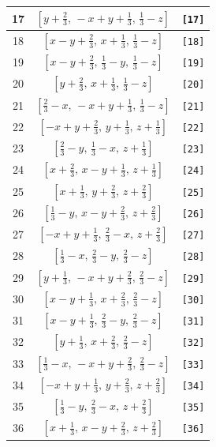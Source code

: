 \documentclass[fleqn,8pt]{jsarticle}
\begin{document}
\begin{longtable}{ccc}
17 & $\left[ y + \frac{2}{3},\, - x + y + \frac{1}{3},\, \frac{1}{3} - z \right]$ & {\tt [17]} \\ \hline
18 & $\left[ x - y + \frac{2}{3},\, x + \frac{1}{3},\, \frac{1}{3} - z \right]$ & {\tt [18]} \\ \hline
19 & $\left[ x - y + \frac{2}{3},\, \frac{1}{3} - y,\, \frac{1}{3} - z \right]$ & {\tt [19]} \\ \hline
20 & $\left[ y + \frac{2}{3},\, x + \frac{1}{3},\, \frac{1}{3} - z \right]$ & {\tt [20]} \\ \hline
21 & $\left[ \frac{2}{3} - x,\, - x + y + \frac{1}{3},\, \frac{1}{3} - z \right]$ & {\tt [21]} \\ \hline
22 & $\left[ - x + y + \frac{2}{3},\, y + \frac{1}{3},\, z + \frac{1}{3} \right]$ & {\tt [22]} \\ \hline
23 & $\left[ \frac{2}{3} - y,\, \frac{1}{3} - x,\, z + \frac{1}{3} \right]$ & {\tt [23]} \\ \hline
24 & $\left[ x + \frac{2}{3},\, x - y + \frac{1}{3},\, z + \frac{1}{3} \right]$ & {\tt [24]} \\ \hline
25 & $\left[ x + \frac{1}{3},\, y + \frac{2}{3},\, z + \frac{2}{3} \right]$ & {\tt [25]} \\ \hline
26 & $\left[ \frac{1}{3} - y,\, x - y + \frac{2}{3},\, z + \frac{2}{3} \right]$ & {\tt [26]} \\ \hline
27 & $\left[ - x + y + \frac{1}{3},\, \frac{2}{3} - x,\, z + \frac{2}{3} \right]$ & {\tt [27]} \\ \hline
28 & $\left[ \frac{1}{3} - x,\, \frac{2}{3} - y,\, \frac{2}{3} - z \right]$ & {\tt [28]} \\ \hline
29 & $\left[ y + \frac{1}{3},\, - x + y + \frac{2}{3},\, \frac{2}{3} - z \right]$ & {\tt [29]} \\ \hline
30 & $\left[ x - y + \frac{1}{3},\, x + \frac{2}{3},\, \frac{2}{3} - z \right]$ & {\tt [30]} \\ \hline
31 & $\left[ x - y + \frac{1}{3},\, \frac{2}{3} - y,\, \frac{2}{3} - z \right]$ & {\tt [31]} \\ \hline
32 & $\left[ y + \frac{1}{3},\, x + \frac{2}{3},\, \frac{2}{3} - z \right]$ & {\tt [32]} \\ \hline
33 & $\left[ \frac{1}{3} - x,\, - x + y + \frac{2}{3},\, \frac{2}{3} - z \right]$ & {\tt [33]} \\ \hline
34 & $\left[ - x + y + \frac{1}{3},\, y + \frac{2}{3},\, z + \frac{2}{3} \right]$ & {\tt [34]} \\ \hline
35 & $\left[ \frac{1}{3} - y,\, \frac{2}{3} - x,\, z + \frac{2}{3} \right]$ & {\tt [35]} \\ \hline
36 & $\left[ x + \frac{1}{3},\, x - y + \frac{2}{3},\, z + \frac{2}{3} \right]$ & {\tt [36]} \\
\end{longtable}
\end{document}
